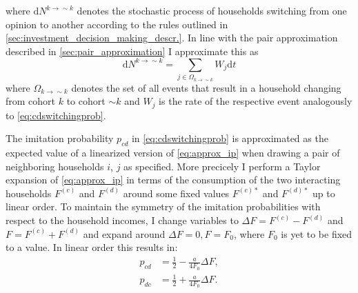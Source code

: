where $\mathrm{ d} N^{k \rightarrow \sim k}$ denotes the stochastic process of households switching from one opinion to another according to the rules outlined in \cref{sec:investment_decision_making_descr.}. In line with the pair approximation described in \cref{sec:pair_approximation} I approximate this as
\begin{equation}
\mathrm{ d} N^{k \rightarrow \sim k} = \sum_{j \in \Omega_{k \rightarrow \sim k}}W_j \mathrm{ d}t
\end{equation}
where $\Omega_{k \rightarrow \sim k}$ denotes the set of all events that result in a household changing from cohort $k$ to cohort $\sim k$ and $W_j$ is the rate of the respective event analogously to \cref{eq:cdswitchingprob}.

The imitation probability $p_{cd}$ in \cref{eq:cdswitchingprob} is approximated as the expected value of a linearized version of \cref{eq:approx_ip} when drawing a pair of neighboring households $i$, $j$ as specified. More precicely I perform a Taylor expansion of \cref{eq:approx_ip} in terms of the consumption of the two interacting households $F^{(c)}$ and $F^{(d)}$ around some fixed values $F^{(c)*}$ and $F^{(d)*}$ up to linear order. To maintain the symmetry of the imitation probabilities with respect to the household incomes, I change variables to $\Delta F = F^{(c)} - F^{(d)}$ and $F = F^{(c)} + F^{(d)}$ and expand around $\Delta F = 0, F = F_0$, where $F_0$ is yet to be fixed to a value. In linear order this results in:
\begin{align}
	p_{cd} &= \frac{1}{2} - \frac{a}{4 F_0} \Delta F, \label{eq:approx_p_cd}\\
	p_{dc} &= \frac{1}{2} + \frac{a}{4 F_0} \Delta F. \label{eq:approx_p_dc}
\end{align}

